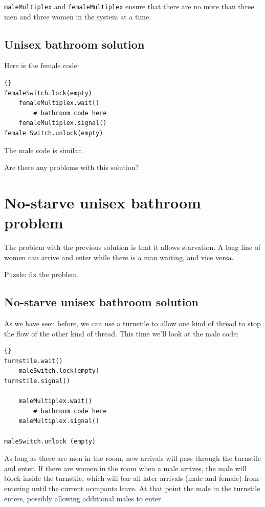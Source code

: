 \documentclass{book}
\newcommand{\clearemptydoublepage}{\newpage\cleardoublepage}
\begin{document}
{\tt maleMultiplex} and {\tt femaleMultiplex} ensure that there are no
more than three men and three women in the system at a time.


\clearemptydoublepage
\subsection {Unisex bathroom solution}

Here is the female code:

\begin{lstlisting}[title={Unisex bathroom solution (female)}]{}
femaleSwitch.lock(empty)
    femaleMultiplex.wait()
        # bathroom code here
    femaleMultiplex.signal()
female Switch.unlock(empty)
\end{lstlisting}

The male code is similar.

Are there any problems with this solution?

\clearemptydoublepage
\section {No-starve unisex bathroom problem}

The problem with the previous solution is that it allows starvation.
A long line of women can arrive and enter while there is a man
waiting, and vice versa.

Puzzle: fix the problem.


\clearemptydoublepage
\subsection {No-starve unisex bathroom solution}

As we have seen before, we can use a turnstile to allow one
kind of thread to stop the flow of the other kind of thread.
This time we'll look at the male code:

\begin{lstlisting}[title={No-starve unisex bathroom solution (male)}]{}
turnstile.wait()
    maleSwitch.lock(empty)
turnstile.signal()

    maleMultiplex.wait()
        # bathroom code here
    maleMultiplex.signal()

maleSwitch.unlock (empty)
\end{lstlisting}

As long as there are men in the room, new arrivals will pass
through the turnstile and enter.  If there are women in the room
when a male arrives, the male will block inside the turnstile,
which will bar all later arrivals (male and female) from entering
until the current occupants leave.  At that point the male in
the turnstile enters, possibly allowing additional males to enter.
\end{document}
